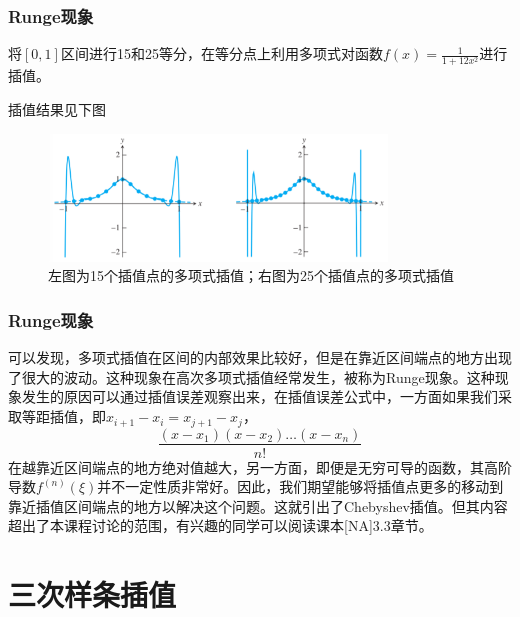\documentclass[10pt]{beamer}
\begin{document}
\begin{frame}
\frametitle{Runge现象}
\begin{example}
将$[0,1]$区间进行15和25等分，在等分点上利用多项式对函数$f(x) = \frac{1}{1 + 12x^2}$进行插值。
\end{example}
插值结果见下图
\begin{figure}
\includegraphics[width=9cm]{figs/3-2-3_Runge-1} 
\caption{左图为15个插值点的多项式插值；右图为25个插值点的多项式插值} 
\end{figure}
\end{frame}


\begin{frame}
\frametitle{Runge现象}
可以发现，多项式插值在区间的内部效果比较好，但是在靠近区间端点的地方出现了很大的波动。这种现象在高次多项式插值经常发生，被称为Runge现象。这种现象发生的原因可以通过插值误差观察出来，在插值误差公式中，一方面如果我们采取等距插值，即$x_{i+1} - x_i = x_{j+1} - x_j$，
\begin{equation}
\frac{(x - x_1)(x - x_2) \ldots (x-x_n)}{n!}
\end{equation}
在越靠近区间端点的地方绝对值越大，另一方面，即便是无穷可导的函数，其高阶导数$f^{(n)}(\xi)$并不一定性质非常好。因此，我们期望能够将插值点更多的移动到靠近插值区间端点的地方以解决这个问题。这就引出了Chebyshev插值。但其内容超出了本课程讨论的范围，有兴趣的同学可以阅读课本[NA]3.3章节。
\end{frame}





\section{三次样条插值}
\end{document}
